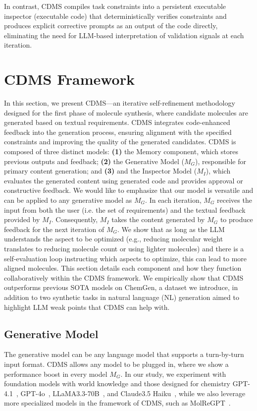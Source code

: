 \documentclass[10pt]{article} %
\begin{document}
In contrast, CDMS compiles task constraints into a persistent executable inspector (executable code) that deterministically verifies constraints and produces explicit corrective prompts as an output of the code directly, eliminating the need for LLM-based interpretation of validation signals at each iteration.
    
\section{CDMS Framework}
    \label{sec:cdms}
    In this section, we present CDMS—an iterative self-refinement methodology designed for the first phase of molecule synthesis, where candidate molecules are generated based on textual requirements. CDMS integrates code-enhanced feedback into the generation process, ensuring alignment with the specified constraints and improving the quality of the generated candidates.
    CDMS is composed of three distinct models: \textbf{(1)} the Memory component, which stores previous outputs and feedback; \textbf{(2)} the Generative Model ($M_G$), responsible for primary content generation; and \textbf{(3)} and the Inspector Model ($M_I$), which evaluates the generated content using generated code and provides approval or constructive feedback. We would like to emphasize that our model is versatile and can be applied to any generative model as $M_G$.
    In each iteration, \( M_G \) receives the input from both the user (i.e. the set of requirements) and the textual feedback provided by \( M_I \). Consequently, \( M_I \) takes the content generated by \( M_G \) to produce feedback for the next iteration of \( M_G \).
    We show that as long as the LLM understands the aspect to be optimized (e.g., reducing molecular weight translates to reducing molecule count or using lighter molecules) and there is a self-evaluation loop instructing which aspects to optimize, this can lead to more aligned molecules.
    This section details each component and how they function collaboratively within the CDMS framework.  
    We empirically show that CDMS outperforms previous SOTA models on ChemGen, a dataset we introduce, in addition to two synthetic tasks in natural language (NL) generation aimed to highlight LLM weak points that CDMS can help with.
        
    \subsection{Generative Model}
    The generative model can be any language model that supports a turn-by-turn input format. CDMS allows any model to be plugged in, where we show a performance boost in every model $M_G$. In our study, we experiment with foundation models with world knowledge and those designed for chemistry GPT-4.1~\cite{openai2025gpt41}, GPT-4o~\cite{openai2024gpt4technicalreport}, LLaMA3.3-70B~\cite{grattafiori2024llama3herdmodels}, and Claude3.5 Haiku~\cite{Anthropic2023}, while we also leverage more specialized models in the framework of CDMS, such as MolReGPT~\cite{molregpt}.
\end{document}
